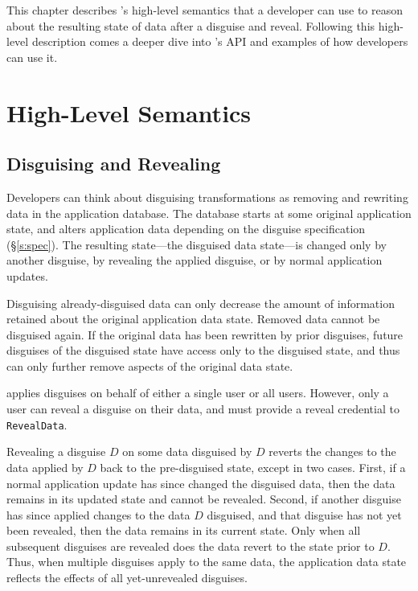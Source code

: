This chapter describes \sys's high-level semantics that a developer can use to
reason about the resulting state of data after a disguise and reveal. Following
this high-level description comes a deeper dive into \sys's API and examples of
how developers can use it.

\section{High-Level Semantics}

\subsection{Disguising and Revealing}
Developers can think about disguising transformations as removing and rewriting
data in the application database.
%
The database starts at some original application state, and alters application
data depending on the disguise specification (\S\ref{s:spec}).  The resulting
state---the disguised data state---is changed only by another disguise, by
revealing the applied disguise, or by normal application updates.
%

%
Disguising already-disguised data can only decrease the amount of information
retained about the original application data state. Removed data cannot be
disguised again. If the original data has been rewritten by prior disguises,
future disguises of the disguised state have access only to the disguised state,
and thus can only further remove aspects of the original data state.
%

%
\sys applies disguises on behalf of either a single user or all users. However,
only a user can reveal a disguise on their data, and must provide a reveal
credential to \texttt{RevealData}.
%

%
Revealing a disguise $D$ on some data disguised by $D$ reverts the changes to
the data applied by $D$ back to the pre-disguised state, except in two cases.
First, if a normal application update has since changed the disguised data, then
the data remains in its updated state and cannot be revealed.
%
Second, if another disguise has since applied changes to the data $D$ disguised,
and that disguise has not yet been revealed, then the data remains in its
current state.
%
Only when all subsequent disguises are revealed does the data revert to the
state prior to $D$.
%
Thus, when multiple disguises apply to the same data, the application data state reflects the
effects of all yet-unrevealed disguises.
%

